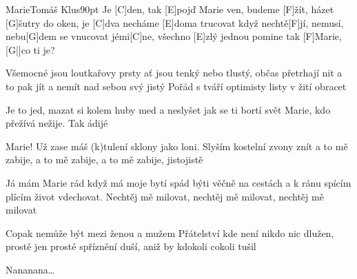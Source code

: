 \begin{song}{Marie}{Tomáš Klus}{90pt}
%
Je [C]den, tak [E]pojď Marie ven,
budeme [F]{ž}ít, házet [G]{š}utry do oken,
je [C]dva necháme [E]doma trucovat
když nechtě[F]jí, nemusí, nebu[G]dem se vnucovat
jémi[C]ne, všechno [E]zlý jednou pomine
tak [F]Marie, [G|]{}co ti je?

%
Všemocné jsou loutkařovy prsty
ať jsou tenký nebo tlustý, občas přetrhají nit
a to pak jít a nemít nad sebou svý jistý
Pořád s tváří optimisty listy v žití obracet

%
Je to jed, mazat si kolem huby med
a neslyšet jak se ti bortí svět
Marie, kdo přežívá nežije.
Tak ádijé

%
Marie! Už zase máš (k)tulení sklony
jako loni. Slyším kostelní zvony znít
a to mě zabije, a to mě zabije,
a to mě zabije, jistojistě

\chorus%
Já mám Marie rád když má moje bytí spád
býti věčně na cestách a k ránu spícím plícím život vdechovat.
Nechtěj mě milovat, nechtěj mě milovat, nechtěj mě milovat

%
Copak nemůže být mezi ženou a mužem
Přátelství kde není nikdo nic dlužen, prostě
jen prosté spříznění duší,
aniž by kdokoli cokoli tušil

%
Nananana\dots
\repchor
\end{song}
